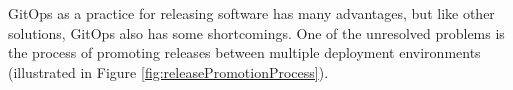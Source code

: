 %
%
%






\noindent
GitOps as a practice for releasing software has many advantages,
but like other solutions, GitOps also has some shortcomings.
One of the unresolved problems is
the process of promoting releases between multiple deployment environments (illustrated in Figure \ref{fig:releasePromotionProcess}).


